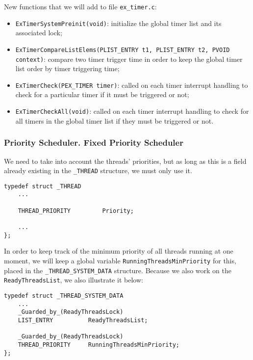 New functions that we will add to file \lstinline|ex_timer.c|:
\begin{itemize}
    \item \lstinline|ExTimerSystemPreinit(void)|: initialize the global timer list and its associated lock;
    \item \lstinline|ExTimerCompareListElems(PLIST_ENTRY t1, PLIST_ENTRY t2, PVOID context)|: compare two timer trigger time in order to keep the global timer list order by timer triggering time;
    \item \lstinline|ExTimerCheck(PEX_TIMER timer)|: called on each timer interrupt handling to check for a particular timer if it must be triggered or not;
    \item \lstinline|ExTimerCheckAll(void)|: called on each timer interrupt handling to check for all timers in the global timer list if they must be triggered or not.
\end{itemize}


\subsubsection{Priority Scheduler. Fixed Priority Scheduler}
\label{subsubsec:prio-sched-data-structures}

We need to take into account the threads' priorities, but as long as this is a field already existing in the \lstinline|_THREAD| structure, we must only use it. 

\begin{lstlisting}
typedef struct _THREAD
    ...
    
    THREAD_PRIORITY         Priority;
    
    ...
};
\end{lstlisting}

In order to keep track of the minimum priority of all threads running at one moment, we will keep a global variable \lstinline|RunningThreadsMinPriority| for this, placed in the \lstinline|_THREAD_SYSTEM_DATA| structure. Because we also work on the \lstinline|ReadyThreadsList|, we also illustrate it below:
\begin{lstlisting}
typedef struct _THREAD_SYSTEM_DATA
    ...
    _Guarded_by_(ReadyThreadsLock)
    LIST_ENTRY          ReadyThreadsList;

	_Guarded_by_(ReadyThreadsLock)
    THREAD_PRIORITY     RunningThreadsMinPriority;
};   
\end{lstlisting}

